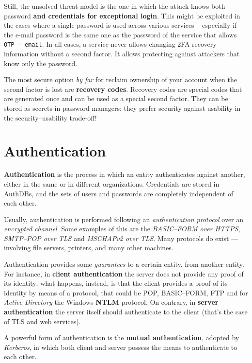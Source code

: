 \documentclass[10pt]{\classname}
\begin{document}
Still, the unsolved threat model is the one in which the attack knows both
password \textbf{and credentials for exceptional login}. This might be
exploited in the cases where a single password is used across various services
-- especially if the e\--mail password is the same one as the password of the
service that allows \texttt{OTP --- email}. In all cases, a service never allows
changing 2FA recovery information without a second factor. It allows protecting
against attackers that know only the password.

The most secure option \emph{by far} for reclaim ownership of your account when
the second factor is lost are \textbf{recovery codes}. Recovery codes are
special codes that are generated once and can be used as a special second
factor. They can be stored as secrets in password managers: they prefer
security against usability in the security\---usability trade\--off!


\chapter{Authentication}

\textbf{Authentication} is the process in which an entity authenticates against
another, either in the same or in different organizations. Credentials are
stored in AuthDBs, and the sets of users and passwords are completely
independent of each other.

Usually, authentication is performed following an \emph{authentication
protocol} over an \emph{encrypted channel}. Some examples of this are the
\emph{BASIC\---FORM over HTTPS}, \emph{SMTP\---POP over TLS} and \emph{MSCHAPv2
over TLS}. Many protocols do exist --- involving file servers, printers, and
many other machines.

Authentication provides some \emph{guarantees} to a certain entity, from
another entity. For instance, in \textbf{client authentication} the server does
not provide any proof of its identity; what happens, instead, is that the
client provides a proof of its identity by means of a protocol, that could be
POP, BASIC\---FORM, FTP and for \emph{Active Directory} the Windows
\textbf{NTLM} protocol. On contrary, in \textbf{server authentication} the
server itself should authenticate to the client (that's the case of TLS and web
services).

A powerful form of authentication is the \textbf{mutual authentication},
adopted by \emph{Kerberos}, in which both client and server possess the means
to authenticate to each other.
\end{document}
